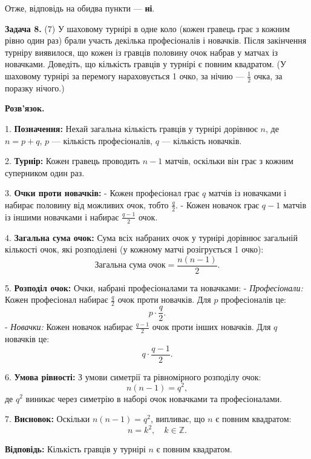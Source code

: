 \documentclass{article}
\begin{document}
Отже, відповідь на обидва пункти — \textbf{ні}.

\bigskip

\noindent\textbf{Задача 8.} (7) У шаховому турнірі в одне коло (кожен гравець грає з кожним рівно один раз) брали участь декілька професіоналів і новачків. Після закінчення турніру виявилося, що кожен із гравців половину очок набрав у матчах із новачками. Доведіть, що кількість гравців у турнірі є повним квадратом. (У шаховому турнірі за перемогу нараховується 1 очко, за нічию — \(\frac{1}{2}\) очка, за поразку нічого.)

\bigskip

\textbf{Розв’язок.}

1. \textbf{Позначення:}  
   Нехай загальна кількість гравців у турнірі дорівнює \( n \), де \( n = p + q \), \( p \) — кількість професіоналів, \( q \) — кількість новачків.

2. \textbf{Турнір:}  
   Кожен гравець проводить \( n-1 \) матчів, оскільки він грає з кожним суперником один раз.

3. \textbf{Очки проти новачків:}  
   - Кожен професіонал грає \( q \) матчів із новачками і набирає половину від можливих очок, тобто \( \frac{q}{2} \).
   - Кожен новачок грає \( q-1 \) матчів із іншими новачками і набирає \( \frac{q-1}{2} \) очок.

4. \textbf{Загальна сума очок:}  
   Сума всіх набраних очок у турнірі дорівнює загальній кількості очок, які розподілені (у кожному матчі розігрується 1 очко):
   \[
   \text{Загальна сума очок} = \frac{n(n-1)}{2}.
   \]

5. \textbf{Розподіл очок:}  
   Очки, набрані професіоналами та новачками:
   - \textit{Професіонали:} Кожен професіонал набирає \( \frac{q}{2} \) очок проти новачків. Для \( p \) професіоналів це:
     \[
     p \cdot \frac{q}{2}.
     \]
   - \textit{Новачки:} Кожен новачок набирає \( \frac{q-1}{2} \) очок проти інших новачків. Для \( q \) новачків це:
     \[
     q \cdot \frac{q-1}{2}.
     \]

6. \textbf{Умова рівності:}  
   З умови симетрії та рівномірного розподілу очок:
   \[
   n(n-1) = q^2,
   \]
   де \( q^2 \) виникає через симетрію в наборі очок новачками та професіоналами.

7. \textbf{Висновок:}  
   Оскільки \( n(n-1) = q^2 \), випливає, що \( n \) є повним квадратом:
   \[
   n = k^2, \quad k \in \mathbb{Z}.
   \]

\textbf{Відповідь:} Кількість гравців у турнірі \( n \) є повним квадратом.
\end{document}
